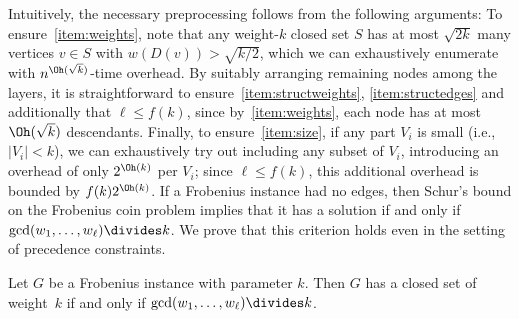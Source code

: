 %
Intuitively, the necessary preprocessing follows from the following arguments: To ensure~\ref{item:weights}, note that any weight-$k$ closed set $S$ has at most $\sqrt{2k}$ many vertices $v\in S$ with $w(D(v)) > \sqrt{k/2}$, which we can exhaustively enumerate with $n^{\Oh(\sqrt{k})}$-time overhead. By suitably arranging remaining nodes among the layers, it is straightforward to ensure~\ref{item:structweights}, \ref{item:structedges} and additionally that $\ell \le f(k)$, since by~\ref{item:weights}, each node has at most $\Oh(\sqrt{k})$ descendants. Finally, to ensure~\ref{item:size}, if any part $V_i$ is small (i.e., $|V_i| < k$), we can exhaustively try out including any subset of $V_i$, introducing an overhead of only $2^{\Oh(k)}$ per $V_i$; since $\ell \le f(k)$, this additional overhead is bounded by $f(k)2^{\Oh(k)}$.  
%
%
%
%
%
If a Frobenius instance had no edges, then Schur's bound on the Frobenius coin problem implies that it has a solution if and only if $\gcd(w_1,\dots, w_\ell) \divides k$. We prove that this criterion holds even in the setting of precedence constraints.  
%
\begin{lem}\label{lem:Frobcrit}
Let $G$ be a Frobenius instance with  parameter $k$. Then $G$ has a closed set of weight~$k$ if and only if $\gcd(w_1,\dots, w_\ell) \divides k$.
\end{lem}
